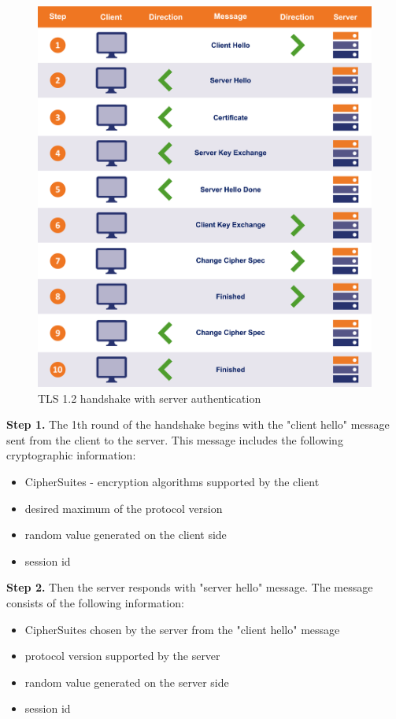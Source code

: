\begin{figure}[H]
	\centering
		\includegraphics[scale=0.35]{images/handshake1_2.png}
	\caption{TLS 1.2 handshake with server authentication \cite{sslstore:handshake}}
	\label{fig:handshake1_2}
\end{figure}

\textbf{Step 1.} The 1th round of the handshake begins with the "client hello" message sent from the client to the server. This message includes the following cryptographic information:

\begin{itemize}
	\item CipherSuites - encryption algorithms supported by the client
	\item desired maximum of the protocol version
	\item random value generated on the client side
	\item session id
\end{itemize}

\textbf{Step 2.} Then the server responds with "server hello" message. The message consists of the following information:

\begin{itemize}
	\item CipherSuites chosen by the server from the "client hello" message
	\item protocol version supported by the server
	\item random value generated on the server side
	\item session id
\end{itemize}

